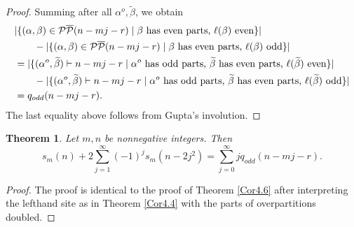 \documentclass{amsart}
\newtheorem{theorem}{Theorem}[section]
\theoremstyle{definition}
\begin{document}
\begin{proof}
Summing after all $\alpha^o, \widetilde \beta$, we obtain
\begin{align*}& |\{(\alpha, \beta) \in  \mathcal P \overline{\mathcal P}(n-mj-r) \mid \beta \text{ has even parts, } \ell(\beta) \text{ even}\}|\\   & \qquad-  |\{(\alpha, \beta)\in  \mathcal P \overline{\mathcal P}(n-mj-r) \mid \beta \text{ has even parts, } \ell(\beta)  \text{ odd}\}|\\ \hspace*{-1cm} & = |\{(\alpha^o, \widetilde\beta)\vdash n-mj-r \mid \alpha^o\text{ has odd parts, } \widetilde\beta \text{ has even parts, } \ell(\widetilde\beta) \text{ even}\}|\\  & \qquad-   |\{(\alpha^o, \widetilde\beta)\vdash n-mj-r \mid \alpha^o\text{ has odd parts, } \widetilde\beta \text{ has even parts, } \ell(\widetilde\beta) \text{ odd}\}|\\ & = q_{odd}(n-mj-r).
\end{align*} The last equality above follows from Gupta's involution. 
\end{proof}

\begin{theorem}{\cite[Corollary 4.7(i)]{M23}} Let $m,n$ be nonnegative integers. Then \begin{equation*} \label{C4.7} s_{m}(n)+2\sum_{j=1}^\infty (-1)^j s_{m}(n-2j^2)= \sum_{j=0}^\infty jq_{odd}(n-mj-r).\end{equation*}\end{theorem}
\begin{proof}The proof is identical to the proof of Theorem \ref{Cor4.6} after interpreting the lefthand site as in Theorem \ref{Cor4.4} with the parts of overpartitions doubled. 
\end{proof}
\end{document}
